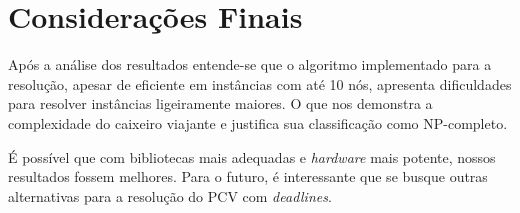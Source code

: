 \documentclass[12pt]{article}
\begin{document}
\FloatBarrier

\section{Considerações Finais}

Após a análise dos resultados entende-se que o algoritmo implementado para a resolução, apesar de eficiente em instâncias com até 10 nós, apresenta dificuldades para resolver instâncias ligeiramente maiores. O que nos demonstra a complexidade do caixeiro viajante e justifica sua classificação como NP-completo.

É possível que com bibliotecas mais adequadas e {\it hardware} mais potente, nossos resultados fossem melhores. Para o futuro, é interessante que se busque outras alternativas para a resolução do PCV com {\it deadlines}.


\clearpage



\end{document}
